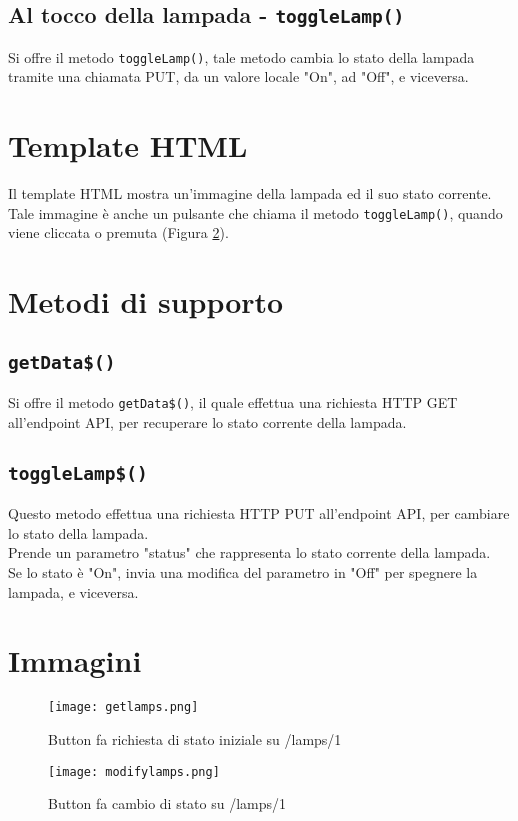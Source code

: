\subsection{Al tocco della lampada - \texttt{toggleLamp()}}

Si offre il metodo \texttt{toggleLamp()}, tale metodo cambia lo stato della lampada tramite una chiamata PUT, da un valore locale "On", ad "Off", e viceversa.

\section{Template HTML}
Il template HTML mostra un'immagine della lampada ed il suo stato corrente. \\
Tale immagine è anche un pulsante che chiama il metodo \texttt{toggleLamp()}, quando viene cliccata o premuta (Figura \ref{fig:modifylamps}).

\section{Metodi di supporto}

\subsection{\texttt{getData\$()}}
Si offre il metodo \texttt{getData\$()}, il quale effettua una richiesta HTTP GET all'endpoint API, per recuperare lo stato corrente della lampada.

\subsection{\texttt{toggleLamp\$()}}
Questo metodo effettua una richiesta HTTP PUT all'endpoint API, per cambiare lo stato della lampada. \\
Prende un parametro "status" che rappresenta lo stato corrente della lampada. \\
Se lo stato è "On", invia una modifica del parametro in "Off" per spegnere la lampada, e viceversa.

\section{Immagini}

\begin{figure}[H]
    \centering
    \texttt{[image: getlamps.png]}
    \caption{Button fa richiesta di stato iniziale su /lamps/1}
    \label{fig:getlamps}
\end{figure}


\begin{figure}[H]
    \centering
    \texttt{[image: modifylamps.png]}
    \caption{Button fa cambio di stato su /lamps/1}
    \label{fig:modifylamps}
\end{figure}